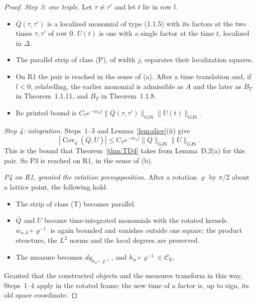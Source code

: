 \documentclass[11pt,a4paper]{article}
\newcommand{\CE}{\mathcal{C}_{\mathrm E}}
\DeclareMathOperator{\Cov}{Cov}
\newcommand{\GJS}[1]{\lVert #1\rVert_{\mathrm{GJS}}}
\theoremstyle{plain}
\theoremstyle{definition}
\begin{document}
\begin{proof}
\emph{Step 3: one triple.}  Let $\tau\ne\tau'$ and let $t$ lie in row $l$.
\begin{itemize}
\item $\overline Q(\tau,\tau')$ is a localized monomial of type (1.1.5) with its factors at the two
times $\tau,\tau'$ of row $0$.  $U(t)$ is one with a single factor at the time $t$, localized in
$\Delta$.
\item The parallel strip of class (P), of width $j$, separates their localization squares.
\item On R1 the pair is reached in the sense of (a).  After a time translation and, if $l<0$,
relabelling, the earlier monomial is admissible as $A$ and the later as $B_T$ in
Theorem~1.1.11, and $B_T$ in Theorem~1.1.8.
\item Its printed bound is $C_7e^{-m_1j}\GJS{\overline Q(\tau,\tau')}\GJS{U(t)}$.
\end{itemize}

\emph{Step 4: integration.}  Steps~1--3 and Lemma~\ref{lem:slice}(ii) give
\[
 |\Cov_q(\overline Q,U)|\le C_7e^{-m_1j}\GJS{\overline Q}\GJS{U} .
\]
This is the bound that
Theorem~\ref{thm:TD4} takes from Lemma~D.2(a) for this pair.  So P3 is reached on R1, in the sense
of (b).

\emph{P4 on R1, granted the rotation presupposition.}  After a rotation $\varrho$ by $\pi/2$ about
a lattice point, the following hold.
\begin{itemize}
\item The strip of class (T) becomes parallel.
\item $\overline Q$ and $U$ become time-integrated monomials with the rotated kernels.
$w_{n,k}\circ\varrho^{-1}$ is again bounded and vanishes outside one square; the product
structure, the $L^2$ norms and the local degrees are preserved.
\item The measure becomes $dq_{h_\alpha\circ\varrho^{-1}}$, and $h_\alpha\circ\varrho^{-1}\in\CE$.
\end{itemize}
Granted that the constructed objects and the measures transform in this way, Steps~1--4 apply in
the rotated frame; the new time of a factor is, up to sign, its old space coordinate.


\end{proof}
\end{document}

